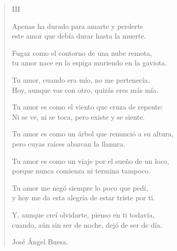\documentclass[11pt, portrait, twoside, notitlepage, openright]{book}
\begin{document}
\begin{verse}
\begin{center}
III
\end{center}

Apenas ha durado para amarte y perderte\\
este amor que debía durar hasta la muerte.
\newline

Fugaz como el contorno de una nube remota,\\
tu amor nace en la espiga muriendo en la gaviota.
\newline

Tu amor, cuando era mío, no me pertenecía.\\
Hoy, aunque vas con otro, quizás eres más mía.
\newline

Tu amor es como el viento que cruza de repente:\\
Ni se ve, ni se toca, pero existe y se siente.
\newline

Tu amor es como un árbol que renunció a su altura,\\
pero cuyas raíces abarcan la llanura.
\newline

Tu amor es como un viaje por el sueño de un loco,\\
porque nunca comienza ni termina tampoco. 
\newpage

Tu amor me negó siempre lo poco que pedí,\\
y hoy me da esta alegría de estar triste por ti.
\newline

Y, aunque creí olvidarte, pienso en ti todavía,\\
cuando, aún sin ser de noche, dejó de ser de día.
\newline

José Ángel Buesa.
\end{verse}
\end{document}
